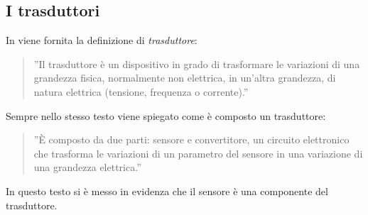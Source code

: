 \documentclass[a4paper]{report} %
\begin{document}

\subsection{I trasduttori}
In \cite{art:rif.11} viene fornita la definizione di \textit{trasduttore}:
\begin{quote}
	''Il trasduttore è un dispositivo in grado di trasformare le variazioni di una grandezza fisica, normalmente non elettrica, in un'altra grandezza, di natura elettrica (tensione, frequenza o corrente).''
\end{quote}
Sempre nello stesso testo viene spiegato come è composto un trasduttore:
\begin{quote}
	''È composto da due parti: sensore e convertitore, un circuito elettronico che trasforma le variazioni di un parametro del sensore in una variazione di una grandezza elettrica.'' 
\end{quote}
In questo testo si è messo in evidenza che il sensore è una componente del trasduttore.
\end{document}
